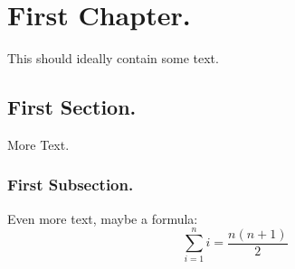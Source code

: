 \documentclass[12pt]{report}
\begin{document}
	
	\clearpage
	
	
	
	\tableofcontents
	
	
	\listoffigures
	
	\listoftables
	
	
	
	\clearpage
	
	
	
	\setcounter{page}{1}
	
	\chapter{First Chapter.}
	This should ideally contain some text.
	\section{First Section.}
	More Text.
	\subsection[Alternative title for the Table of Contents]{First Subsection.}
	Even more text, maybe a formula:
	\begin{equation}
	\sum_{i=1}^{n}i=\frac{n(n+1)}{2} %
	\end{equation}
\end{document}
